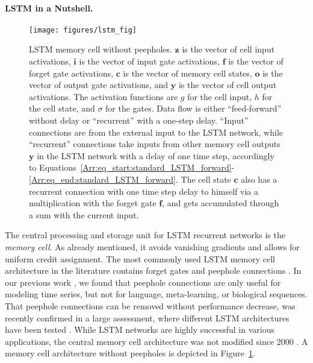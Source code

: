 \documentclass[runningheads]{llncs}
\newcommand\Bc{\bm{c}}%
\newcommand\Bi{\bm{i}}%
\newcommand\Bo{\bm{o}}%
\newcommand\Bf{\bm{f}}%
\newcommand\By{\bm{y}}%
\newcommand\Bz{\bm{z}}%
\begin{document}
\paragraph{LSTM in a Nutshell.}
\begin{figure}[!b]
\centering
\texttt{[image: figures/lstm\_fig]}
\caption{LSTM memory cell without peepholes. 
$\Bz$ is the vector of cell input
activations, $\Bi$ is the vector of input gate
activations,  $\Bf$ is the vector of forget gate
activations,  $\Bc$ is the vector of memory cell states,
$\Bo$ is the vector of output gate
activations, and $\By$ is the vector of cell output 
activations. The activation functions are $g$ for the cell input, $h$ for the cell
state, and $\sigma$ for the gates. Data flow is either ``feed-forward''
without delay or ``recurrent'' with a one-step delay.
``Input'' connections are from the
external input to the LSTM network, while ``recurrent'' connections take inputs
from other memory cell outputs $\By$ in the LSTM network with a delay of one time step, accordingly to Equations~\ref{Arr:eq_start:standard_LSTM_forward}-\ref{Arr:eq_end:standard_LSTM_forward}. 
The cell state $\Bc$ also has a recurrent connection with one time step delay to himself via a multiplication with the forget gate  $\Bf$, and gets accumulated through a sum with the current input.
\label{Arr:fig:cellFB}}
\end{figure}


The central processing and storage unit for LSTM recurrent networks is
the {\em memory cell}. As already mentioned, it avoids vanishing gradients and allows for
uniform credit assignment.
The most commonly used LSTM memory cell architecture in the 
literature \cite{Arr:Graves:05,Arr:Schmidhuber:15} 
contains forget gates \cite{Arr:Gers:99a,Arr:Gers:00}
and peephole connections \cite{Arr:Gers:00a}. 
In our previous work \cite{Arr:Hochreiter:01,Arr:Hochreiter:07}, 
we found that peephole connections are 
only useful for modeling time series, but not for 
language, meta-learning, or biological sequences. 
That peephole connections can be removed without performance decrease, 
was recently confirmed in a large assessment, where 
different LSTM architectures have been tested \cite{Arr:Greff:15}.
While LSTM networks are highly successful in various applications, 
the central memory cell architecture was not modified since 2000 \cite{Arr:Schmidhuber:15}.
A memory cell architecture without peepholes is depicted in
Figure~\ref{Arr:fig:cellFB}. 
\end{document}
